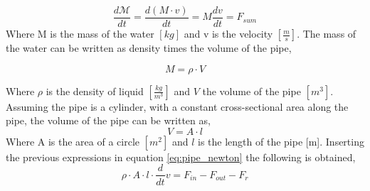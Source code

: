 \begin{equation}\label{eq:pipe_newton}
	\frac{d\mathcal{M}}{dt}=\frac{d(M\cdot v)}{dt}=M\frac{dv}{dt}=F_{sum}
\end{equation}
Where M is the mass of the water $[kg]$ and v is the velocity $\left[\frac{m}{s}\right]$.  
The mass of the water can be written as density times the volume of the pipe,

\begin{equation}
M = \rho \cdot V 
\end{equation}

Where $\rho$ is the density of liquid $\left[\frac{kg}{m^3}\right]$ and $V$ the volume of the pipe $\left[m^3\right]$.
Assuming the pipe is a cylinder, with a constant cross-sectional area along the pipe, the volume of the pipe can be written as, 
\begin{equation}
 V=A \cdot l
\end{equation}
Where A is the area of a circle $[m^2]$ and $l$ is the length of the pipe [m].
Inserting the previous expressions in equation \ref{eq:pipe_newton} the following is obtained,
\begin{equation} \label{eq:pipe_newton_2}
\rho \cdot A \cdot l \cdot \frac{d}{dt}v = F_{in}-F_{out}-F_r 
\end{equation}

